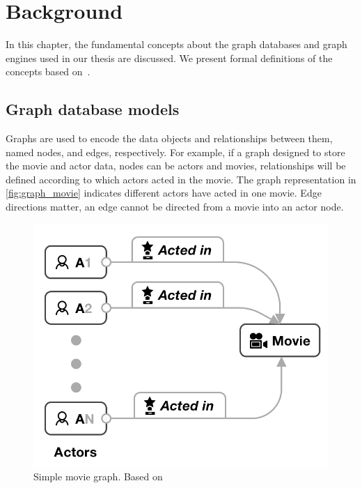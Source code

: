 \chapter{Background}

In this chapter, the fundamental concepts about the graph databases and graph engines used in our thesis are discussed. We present formal definitions of the concepts based on~\cite{DBLP:journals/csur/AnglesABHRV17}.

\section{Graph database models}

Graphs are used to encode the data objects and relationships between them, named nodes, and edges, respectively.
For example, if a graph designed to store the movie and actor data, nodes can be actors and movies, relationships will be defined according to which actors acted in the movie.
The graph representation in \autoref{fig:graph_movie} indicates different actors have acted in one movie. Edge directions matter, \ie an edge cannot be directed from a movie into an actor node.

\begin{figure}[!ht]
  \centering
  \includegraphics[scale=0.3]{figures/graph_movie.png}
  \caption{Simple movie graph. Based on~\cite{DBLP:journals/csur/AnglesABHRV17}} 
  \label{fig:graph_movie}
\end{figure}

